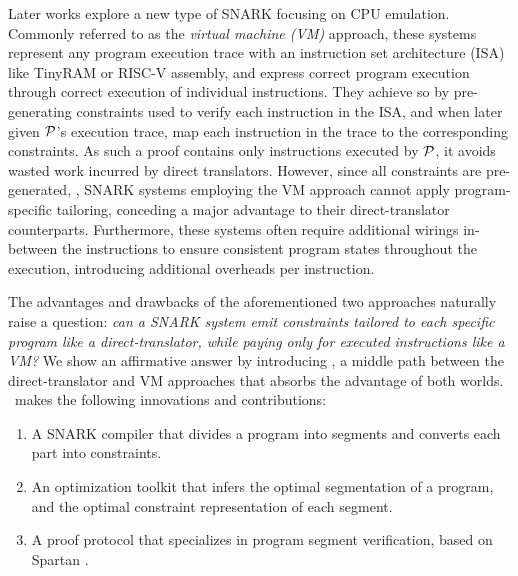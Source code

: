 Later works \cite{zhang18vram, arun23jolt} explore a new type of SNARK focusing on CPU emulation. Commonly referred to as the \emph{virtual machine (VM)} approach, these systems represent any program execution trace with an instruction set architecture (ISA) like TinyRAM or RISC-V assembly, and express correct program execution through correct execution of individual instructions. They achieve so by pre-generating constraints used to verify each instruction in the ISA, and when later given $\P$'s execution trace, map each instruction in the trace to the corresponding constraints. As such a proof contains only instructions executed by $\P$, it avoids wasted work incurred by direct translators. However, since all constraints are pre-generated, , SNARK systems employing the VM approach cannot apply program-specific tailoring, conceding a major advantage to their direct-translator counterparts. Furthermore, these systems often require additional wirings in-between the instructions to ensure consistent program states throughout the execution, introducing additional overheads per instruction.

The advantages and drawbacks of the aforementioned two approaches naturally raise a question: \emph{can a SNARK system emit constraints tailored to each specific program like a direct-translator, while paying only for executed instructions like a VM?} We show an affirmative answer by introducing \CoBBl, a middle path between the direct-translator and VM approaches that absorbs the advantage of both worlds. \CoBBl~makes the following innovations and contributions:
\begin{enumerate}
    \item A SNARK compiler that divides a program into segments and converts each part into constraints.
    \item An optimization toolkit that infers the optimal segmentation of a program, and the optimal constraint representation of each segment.
    \item A proof protocol that specializes in program segment verification, based on Spartan \cite{setty19spartan}.
\end{enumerate}